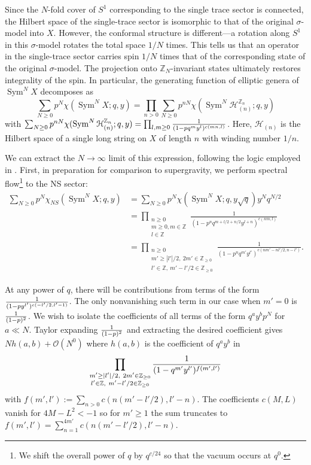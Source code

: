 \documentclass[11pt]{amsart}
\newcommand{\Z}{\mathbb Z}
\DeclareMathOperator{\Sym}{Sym} \DeclareMathOperator{\Hom}{Hom}
\theoremstyle{thm}
\numberwithin{equation}{subsection}
\theoremstyle{def}
\theoremstyle{rem}
\begin{document}
Since the $N$-fold cover of $S^1$ corresponding to the single trace sector is connected, the Hilbert space of the single-trace sector is isomorphic to that of the original $\sigma$-model into $X$.  
However, the conformal structure is different---a rotation along $S^1$ in this $\sigma$-model rotates the total space $1/N$ times.
This tells us that an operator in the single-trace sector carries spin $1/N$ times that of the corresponding state of the original $\sigma$-model. 
The projection onto $\Z_N$-invariant states ultimately restores integrality of the spin. 
In particular, the generating function of elliptic genera of $\Sym^N X$ decomposes as
\begin{equation}
\sum_{N\geq 0}p^N \chi(\Sym^N X; q, y) = \prod_{n>0}\sum_{N \geq 0}p^{n N}\chi(\Sym^{N}\mathcal{H}^{\Z_n}_{(n)}; q, y)
\end{equation}
with $\sum_{N \geq 0}p^{n N}\chi(\Sym^{N}\mathcal{H}^{\Z_n}_{(n)}; q, y) = \prod_{l, m\geq0}{1 \over (1 - p q^m y^l)^{c(mn, l)}}$. Here, $\mathcal{H}_{(n)}$ is the Hilbert space of a single long string on $X$ of length $n$ with winding number $1/n$. 

We can extract the $N \rightarrow \infty$ limit of this expression, following the logic employed in \cite{de Boer, MAGOO, BKKP}. First, in preparation for comparison to supergravity, we perform spectral flow\footnote{We shift the overall power of $q$ by $q^{c/24}$ so that the vacuum occurs at $q^0$.} to the NS sector:
\begin{align*}
\sum_{N \geq 0}p^N \chi_{NS}(\Sym^N X; q, y) & = \sum_{N\geq 0}p^N \chi(\Sym^N X; q, y \sqrt{q}) y^N q^{N/2} \\
&= \prod_{\substack{n \geq 0 \\ m \geq 0, m \in \Z \\ l \in \Z}} \frac{1}{(1 - p^n q^{m + l/2 + n/2} y^{l + n})^{c(nm,l)}} \\
&= \prod_{\substack{n \geq0 \\ m' \geq |l'|/2, \ 2 m' \in \Z_{\geq 0} \\ l' \in \Z, \ m' - l'/2 \in \Z_{\geq 0}}} \frac{1}{(1 - p^n q^{m'} y^{l'})^{c(nm' - nl'/2,n-l')}}.
\end{align*}

At any power of $q$, there will be contributions from terms of the form ${1 \over (1 - p y^{l'})^{c(-l'/2, l'-1)}}$. The only nonvanishing such term in our case when $m'=0$ is ${1 \over (1 - p)^2}$. We wish to isolate the coefficients of all terms of the form $q^a y^b p^N$ for $a \ll N$. Taylor expanding ${1 \over (1-p)^2}$ and extracting the desired coefficient gives $N h(a, b) + \mathcal{O}(N^0)$ where $h(a, b)$ is the coefficient of $q^a y^b$ in
\begin{equation}\nonumber
\prod_{\substack{m' \geq |l'|/2, \ 2 m' \in \Z_{\geq 0} \\ l' \in \Z, \  m' - l'/2 \in \Z_{\geq 0}}}{1 \over (1 - q^{m'} y^{l'})^{f(m', l')}}
\end{equation}with $f(m', l'):= \sum_{n >0}c(n(m' -  l'/2), l' - n)$.  The coefficients $c(M, L)$ vanish for $4M-L^2 < -1$ so for $m' \geq 1$ the sum truncates to $f(m', l') = \sum_{n=1}^{4m'}c(n(m' -  l'/2), l' - n)$.
\end{document}
